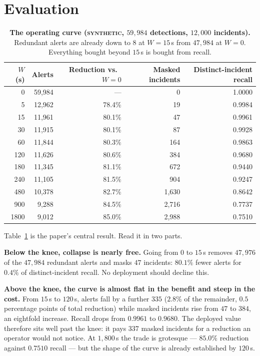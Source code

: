 \documentclass[11pt,a4paper]{article}
\newcommand{\synth}{\textsc{synthetic}}
\begin{document}
\section{Evaluation}
\label{sec:eval}

\begin{table}[t]
\centering\small
\begin{tabular}{rrrrr}
\toprule
\textbf{$W$ (s)} & \textbf{Alerts} & \textbf{Reduction vs.\ $W{=}0$} & \textbf{Masked incidents} & \textbf{Distinct-incident recall} \\
\midrule
0    & 59{,}984 & ---     & 0     & 1.0000 \\
5    & 12{,}962 & 78.4\% & 19    & 0.9984 \\
15   & 11{,}961 & 80.1\% & 47    & 0.9961 \\
30   & 11{,}915 & 80.1\% & 87    & 0.9928 \\
60   & 11{,}844 & 80.3\% & 164   & 0.9863 \\
120  & 11{,}626 & 80.6\% & 384   & 0.9680 \\
180  & 11{,}345 & 81.1\% & 672   & 0.9440 \\
240  & 11{,}105 & 81.5\% & 904   & 0.9247 \\
480  & 10{,}378 & 82.7\% & 1{,}630 & 0.8642 \\
900  & 9{,}288  & 84.5\% & 2{,}716 & 0.7737 \\
1800 & 9{,}012  & 85.0\% & 2{,}988 & 0.7510 \\
\bottomrule
\end{tabular}
\caption{\textbf{The operating curve (\synth, $59{,}984$ detections,
$12{,}000$ incidents).} Redundant alerts are already down to $8$ at $W{=}15$\,s
from $47{,}984$ at $W{=}0$. Everything bought beyond $15$\,s is bought from
recall.}
\label{tab:sweep}
\end{table}

Table~\ref{tab:sweep} is the paper's central result. Read it in two parts.

\textbf{Below the knee, collapse is nearly free.} Going from $0$ to $15$\,s
removes $47{,}976$ of the $47{,}984$ redundant alerts and masks $47$ incidents:
$80.1\%$ fewer alerts for $0.4\%$ of distinct-incident recall. No deployment
should decline this.

\textbf{Above the knee, the curve is almost flat in the benefit and steep in the
cost.} From $15$\,s to $120$\,s, alerts fall by a further $335$ ($2.8\%$ of the
remainder, $0.5$ percentage points of total reduction) while masked incidents rise
from $47$ to $384$, an eightfold increase. Recall drops from $0.9961$ to $0.9680$.
The deployed value therefore sits well past the knee: it pays $337$ masked
incidents for a reduction an operator would not notice. At $1{,}800$\,s the trade
is grotesque --- $85.0\%$ reduction against $0.7510$ recall --- but the shape of the
curve is already established by $120$\,s.
\end{document}
